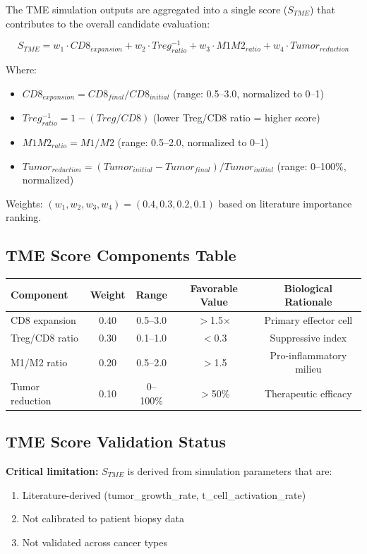 \documentclass{article}
\begin{document}
The TME simulation outputs are aggregated into a single score ($S_{TME}$) that contributes to the overall candidate evaluation:

\begin{equation}
S_{TME} = w_1 \cdot CD8_{expansion} + w_2 \cdot Treg_{ratio}^{-1} + w_3 \cdot M1M2_{ratio} + w_4 \cdot Tumor_{reduction}
\end{equation}

Where:
\begin{itemize}
\item $CD8_{expansion} = CD8_{final} / CD8_{initial}$ (range: 0.5--3.0, normalized to 0--1)
\item $Treg_{ratio}^{-1} = 1 - (Treg / CD8)$ (lower Treg/CD8 ratio = higher score)
\item $M1M2_{ratio} = M1 / M2$ (range: 0.5--2.0, normalized to 0--1)
\item $Tumor_{reduction} = (Tumor_{initial} - Tumor_{final}) / Tumor_{initial}$ (range: 0--100\%, normalized)
\end{itemize}

Weights: $(w_1, w_2, w_3, w_4) = (0.4, 0.3, 0.2, 0.1)$ based on literature importance ranking.

\subsection{TME Score Components Table}

\begin{longtable}{lcccc}
\toprule
Component & Weight & Range & Favorable Value & Biological Rationale \\
\midrule
CD8 expansion & 0.40 & 0.5--3.0 & $>$1.5$\times$ & Primary effector cell \\
Treg/CD8 ratio & 0.30 & 0.1--1.0 & $<$0.3 & Suppressive index \\
M1/M2 ratio & 0.20 & 0.5--2.0 & $>$1.5 & Pro-inflammatory milieu \\
Tumor reduction & 0.10 & 0--100\% & $>$50\% & Therapeutic efficacy \\
\bottomrule
\end{longtable}

\subsection{TME Score Validation Status}

\textbf{Critical limitation:} $S_{TME}$ is derived from simulation parameters that are:
\begin{enumerate}
\item Literature-derived (tumor\_growth\_rate, t\_cell\_activation\_rate)
\item Not calibrated to patient biopsy data
\item Not validated across cancer types
\end{enumerate}
\end{document}
